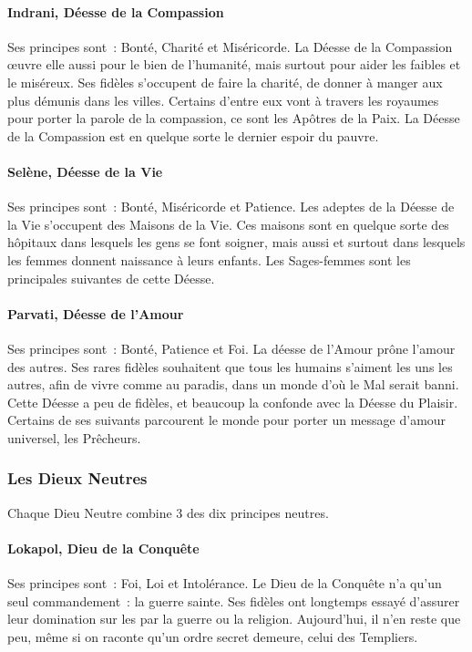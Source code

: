 \documentclass[a4paper,10pt,openany]{book}
\begin{document}
\begin{multicols}{2}
\paragraph{Indrani, Déesse de la Compassion}
Ses principes sont : Bonté, Charité et Miséricorde. La Déesse de la Compassion œuvre elle aussi pour le bien de l’humanité, mais surtout pour aider
les faibles et le miséreux. Ses fidèles s’occupent de faire la charité, de donner à manger aux plus démunis dans les villes. Certains d’entre eux vont
à travers les royaumes pour porter la parole de la compassion, ce sont les Apôtres de la Paix. La Déesse de la Compassion est en quelque sorte le
dernier espoir du pauvre.
\paragraph{Selène, Déesse de la Vie}
Ses principes sont : Bonté, Miséricorde et Patience. Les adeptes de la Déesse de la Vie s’occupent des Maisons de la Vie. Ces maisons sont en quelque
sorte des hôpitaux dans lesquels les gens se font soigner, mais aussi et surtout dans lesquels les femmes donnent naissance à leurs enfants. Les
Sages-femmes sont les principales suivantes de cette Déesse.
\paragraph{Parvati, Déesse de l’Amour}
Ses principes sont : Bonté, Patience et Foi. La déesse de l’Amour prône l’amour des autres. Ses rares fidèles souhaitent que tous les humains s’aiment
les uns les autres, afin de vivre comme au paradis, dans un monde d’où le Mal serait banni. Cette Déesse a peu de fidèles, et beaucoup la confonde
avec la Déesse du Plaisir. Certains de ses suivants parcourent le monde pour porter un message d’amour universel, les Prêcheurs.

\subsubsection{Les Dieux Neutres}
Chaque Dieu Neutre combine 3 des dix principes neutres.
\paragraph{Lokapol, Dieu de la Conquête}
Ses principes sont : Foi, Loi et Intolérance. Le Dieu de la Conquête n’a qu’un seul commandement : la guerre sainte. Ses fidèles ont longtemps essayé
d’assurer leur domination sur les \Royaumes par la guerre ou la religion. Aujourd’hui, il n’en reste que peu, même si on raconte qu’un ordre secret
demeure, celui des Templiers.

\end{multicols}
\end{document}
